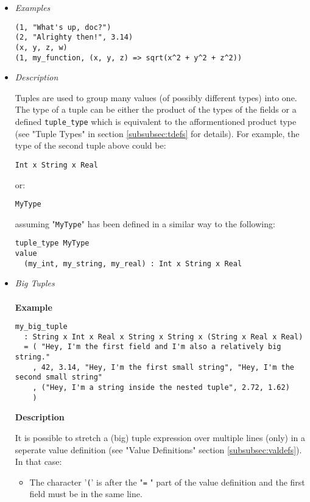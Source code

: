 \documentclass{article}
\begin{document}
\begin{itemize}

\item \textit{Examples}
\begin{verbatim}
(1, "What's up, doc?")
(2, "Alrighty then!", 3.14)
(x, y, z, w)
(1, my_function, (x, y, z) => sqrt(x^2 + y^2 + z^2))
\end{verbatim}

\item \textit{Description}

Tuples are used to group many values (of possibly different types) into one.
The type of a tuple can be either the product of the types of the fields or a
defined \verb|tuple_type| which is equivalent to the afformentioned product
type (see "Tuple Types" in section \ref{subsubsec:tdefs} for details). For
example, the type of the second tuple above could be:
\begin{verbatim}
Int x String x Real
\end{verbatim}
or:
\begin{verbatim}
MyType
\end{verbatim}
assuming "\verb|MyType|" has been defined in a similar way to the following:
\begin{verbatim}
tuple_type MyType
value
  (my_int, my_string, my_real) : Int x String x Real
\end{verbatim}

\newpage
\item \textit{Big Tuples}
\\\\
\textbf{Example}
\begin{verbatim}
my_big_tuple
  : String x Int x Real x String x String x (String x Real x Real)
  = ( "Hey, I'm the first field and I'm also a relatively big string."
    , 42, 3.14, "Hey, I'm the first small string", "Hey, I'm the second small string"
    , ("Hey, I'm a string inside the nested tuple", 2.72, 1.62)
    )
\end{verbatim}

\textbf{Description}

It is possible to stretch a (big) tuple expression over multiple lines (only)
in a seperate value definition (see "Value Definitions" section
\ref{subsubsec:valdefs}).  In that case:
\begin{itemize}
\item
The character '\verb|(|' is after the "\verb|=| " part of the value definition
and the first field must be in the same line.


\end{itemize}
\end{itemize}
\end{document}
